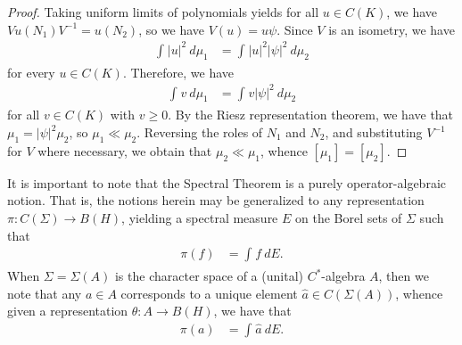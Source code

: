 \documentclass[10pt]{mypackage}
\begin{document}
\begin{proof}
  Taking uniform limits of polynomials yields for all $u\in C(K)$, we have $Vu\left( N_1 \right)V^{-1} = u\left( N_2 \right)$, so we have $V(u) = u\psi$. Since $V$ is an isometry, we have
  \begin{align*}
    \int_{}^{} \left\vert u \right\vert^2\:d\mu_1 &= \int_{}^{} \left\vert u \right\vert^2\left\vert \psi \right\vert^2\:d\mu_2
  \end{align*}
  for every $u\in C(K)$. Therefore, we have
  \begin{align*}
    \int_{}^{} v\:d\mu_1 &= \int_{}^{} v \left\vert \psi \right\vert^2\:d\mu_2
  \end{align*}
  for all $v\in C(K)$ with $v\geq 0$. By the Riesz representation theorem, we have that $\mu_1 = \left\vert \psi \right\vert^2 \mu_2$, so $\mu_1\ll\mu_2$. Reversing the roles of $N_1$ and $N_2$, and substituting $V^{-1}$ for $V$ where necessary, we obtain that $\mu_2\ll\mu_1$, whence $\left[ \mu_1 \right] = \left[ \mu_2 \right]$.
\end{proof}
It is important to note that the Spectral Theorem is a purely operator-algebraic notion. That is, the notions herein may be generalized to any representation $\pi\colon C\left( \Sigma \right)\to B\left( H \right)$, yielding a spectral measure $E$ on the Borel sets of $\Sigma$ such that
\begin{align*}
  \pi(f) &= \int_{}^{} f\:dE.
\end{align*}
When $\Sigma = \Sigma\left( A \right)$ is the character space of a (unital) $C^{\ast}$-algebra $A$, then we note that any $a\in A$ corresponds to a unique element $\hat{a}\in C\left( \Sigma\left( A \right) \right)$, whence given a representation $\theta\colon A\to B\left( H \right)$, we have that
\begin{align*}
  \pi\left( a \right) &= \int_{}^{} \hat{a}\:dE.
\end{align*}
\end{document}

